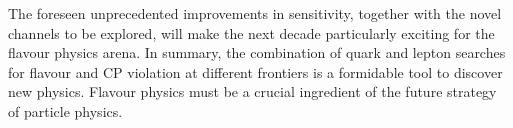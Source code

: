 \bigskip
The foreseen unprecedented improvements in sensitivity, together with the novel  channels to be explored, will make  the next decade particularly exciting for the flavour physics arena. 
In summary, the combination of
quark and lepton searches 
for flavour and CP violation  
 at different frontiers is 
a formidable tool to discover new physics. 
Flavour physics must be a crucial ingredient of the future strategy of particle physics. 


